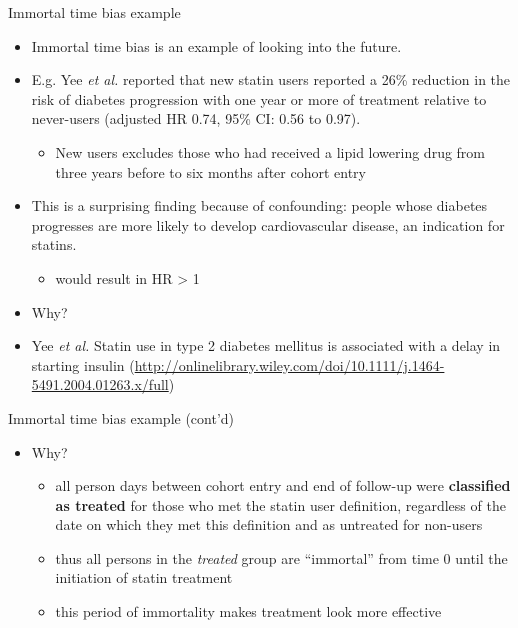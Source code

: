 \documentclass[
  ignorenonframetext,
]{beamer}
\providecommand{\tightlist}{%
  \setlength{\itemsep}{0pt}\setlength{\parskip}{0pt}}
\begin{document}
\begin{frame}{Immortal time bias example}
\protect\hypertarget{immortal-time-bias-example}{}

\begin{itemize}
\tightlist
\item
  Immortal time bias is an example of looking into the future.
\item
  E.g. Yee \emph{et al.} reported that new statin users reported a 26\%
  reduction in the risk of diabetes progression with one year or more of
  treatment relative to never-users (adjusted HR 0.74, 95\% CI: 0.56 to
  0.97).

  \begin{itemize}
  \tightlist
  \item
    New users excludes those who had received a lipid lowering drug from
    three years before to six months after cohort entry
  \end{itemize}
\item
  This is a surprising finding because of confounding: people whose
  diabetes progresses are more likely to develop cardiovascular disease,
  an indication for statins.

  \begin{itemize}
  \tightlist
  \item
    would result in HR \textgreater{} 1
  \end{itemize}
\item
  Why?
\end{itemize}

\tiny

\begin{itemize}
\tightlist
\item
  Yee \emph{et al.} Statin use in type 2 diabetes mellitus is associated
  with a delay in starting insulin
  (\url{http://onlinelibrary.wiley.com/doi/10.1111/j.1464-5491.2004.01263.x/full})
\end{itemize}

\end{frame}

\begin{frame}{Immortal time bias example (cont'd)}
\protect\hypertarget{immortal-time-bias-example-contd}{}

\begin{itemize}
\tightlist
\item
  Why?

  \begin{itemize}
  \tightlist
  \item
    all person days between cohort entry and end of follow-up were
    \textbf{classified as treated} for those who met the statin user
    definition, regardless of the date on which they met this definition
    and as untreated for non-users
  \item
    thus all persons in the \emph{treated} group are ``immortal'' from
    time 0 until the initiation of statin treatment
  \item
    this period of immortality makes treatment look more effective
  \end{itemize}
\end{itemize}

\end{frame}
\end{document}
